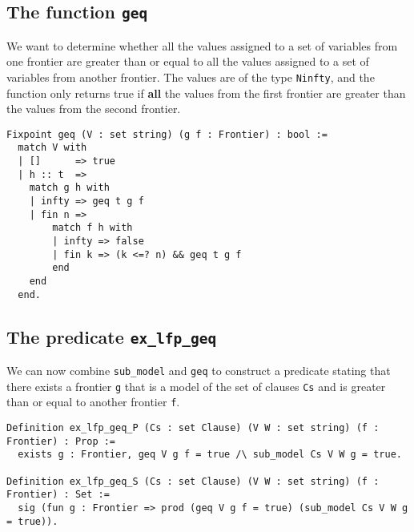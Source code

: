 \subsection{The function \lstinline{geq}}

We want to determine whether all the values assigned to a set of variables
from one frontier are greater than or equal to all the values assigned to a set of variables
from another frontier. The values are of the type \lstinline{Ninfty}, and the function
only returns true if \textbf{all} the values from the first frontier are greater than
the values from the second frontier.

\begin{minipage}{\linewidth}
\begin{lstlisting}[language=Coq, label={lst:geq_def}, caption={Pointwise comparing frontiers with \lstinline{geq} in Coq}]
Fixpoint geq (V : set string) (g f : Frontier) : bool :=
  match V with
  | []      => true
  | h :: t  =>
    match g h with
    | infty => geq t g f
    | fin n =>
        match f h with
        | infty => false
        | fin k => (k <=? n) && geq t g f
        end
    end
  end.
\end{lstlisting}
\end{minipage}

\subsection{The predicate \lstinline{ex_lfp_geq}}
\label{ssec:ex_lfp_geq}

We can now combine \lstinline{sub_model} and \lstinline{geq} to construct a predicate
stating that there exists a frontier \lstinline{g} that is a model of the set of clauses \lstinline{Cs}
and is greater than or equal to another frontier \lstinline{f}.

\begin{minipage}{\linewidth}
\begin{lstlisting}[language=Coq, label={lst:ex_lfp_geq_def}, caption={\lstinline{ex_lfp_geq} in Coq, using both \lstinline{Prop} and \lstinline{Set}}]
Definition ex_lfp_geq_P (Cs : set Clause) (V W : set string) (f : Frontier) : Prop :=
  exists g : Frontier, geq V g f = true /\ sub_model Cs V W g = true.

Definition ex_lfp_geq_S (Cs : set Clause) (V W : set string) (f : Frontier) : Set :=
  sig (fun g : Frontier => prod (geq V g f = true) (sub_model Cs V W g = true)).
\end{lstlisting}
\end{minipage}

